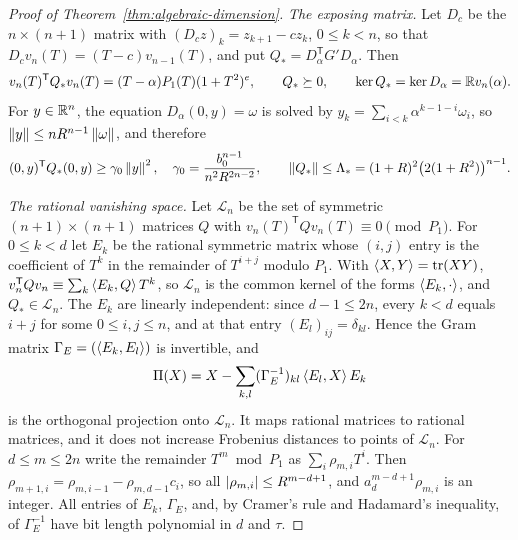 \begin{proof}[Proof of Theorem~\ref{thm:algebraic-dimension}]
\emph{The exposing matrix.} Let $D_c$ be the $n\times(n+1)$ matrix with
$(D_cz)_k=z_{k+1}-cz_k$, $0\le k<n$, so that $D_cv_n(T)=(T-c)v_{n-1}(T)$, and
put $Q_*=D_\alpha^{\mathsf T}G'D_\alpha$. Then
\begin{equation}
 v_n(T)^{\mathsf T}Q_*v_n(T)=(T-\alpha)P_1(T)(1+T^2)^e,\qquad Q_*\succeq0,
 \qquad \ker Q_*=\ker D_\alpha=\mathbb R v_n(\alpha).
 \label{eq:algebraic-qstar}
\end{equation}
For $y\in\mathbb R^n$, the equation $D_\alpha(0,y)=\omega$ is solved by
$y_k=\sum_{i<k}\alpha^{k-1-i}\omega_i$, so $\left\lVert y\right\rVert\le nR^{n-1}\left\lVert\omega\right\rVert$,
and therefore
\begin{equation}
 (0,y)^{\mathsf T}Q_*(0,y)\ge\gamma_0\left\lVert y\right\rVert^2,\quad
 \gamma_0=\frac{b_0^{n-1}}{n^2R^{2n-2}},\qquad
 \left\lVert Q_*\right\rVert\le\Lambda_*=(1+R)^2\bigl(2(1+R^2)\bigr)^{n-1}.
 \label{eq:algebraic-qstar-bounds}
\end{equation}

\emph{The rational vanishing space.} Let $\mathcal L_n$ be the set of
symmetric $(n+1)\times(n+1)$ matrices $Q$ with
$v_n(T)^{\mathsf T}Qv_n(T)\equiv0\pmod{P_1}$. For $0\le k<d$ let $E_k$ be the
rational symmetric matrix whose $(i,j)$ entry is the coefficient of $T^k$ in
the remainder of $T^{i+j}$ modulo $P_1$. With $\left\langle X,Y\right\rangle=\operatorname{tr}(XY)$,
$v_n^{\mathsf T}Qv_n\equiv\sum_k\left\langle E_k,Q\right\rangle T^k$, so $\mathcal L_n$ is the common
kernel of the forms $\left\langle E_k,\cdot\right\rangle$, and $Q_*\in\mathcal L_n$. The $E_k$
are linearly independent: since $d-1\le2n$, every $k<d$ equals $i+j$ for some
$0\le i,j\le n$, and at that entry $(E_l)_{ij}=\delta_{kl}$. Hence the Gram
matrix $\Gamma_E=(\left\langle E_k,E_l\right\rangle)$ is invertible, and
\[
 \Pi(X)=X-\sum_{k,l}(\Gamma_E^{-1})_{kl}\left\langle E_l,X\right\rangle E_k
\]
is the orthogonal projection onto $\mathcal L_n$. It maps rational matrices
to rational matrices, and it does not increase Frobenius distances to points
of $\mathcal L_n$. For $d\le m\le2n$ write the remainder $T^m\bmod P_1$ as
$\sum_i\rho_{m,i}T^i$. Then $\rho_{m+1,i}=\rho_{m,i-1}-\rho_{m,d-1}c_i$, so
all $\left\lvert\rho_{m,i}\right\rvert\le R^{m-d+1}$, and $a_d^{m-d+1}\rho_{m,i}$ is an
integer. All entries of $E_k$, $\Gamma_E$, and, by Cramer's rule and
Hadamard's inequality, of $\Gamma_E^{-1}$ have bit length polynomial in $d$
and $\tau$.


\end{proof}
